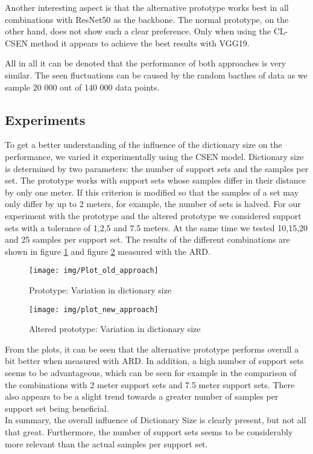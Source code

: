 \documentclass[a4paper, 11pt]{article}
\begin{document}
\begin{multicols}{2}
\begin{flushleft}
Another interesting aspect is that the alternative prototype works best in all combinations with ResNet50 as the backbone. The normal prototype, on the other hand, does not show such a clear preference. Only when using the CL-CSEN method it appears to achieve the best results with VGG19.

All in all it can be denoted that the performance of both approaches is very similar. The seen fluctuations can be caused by the random bacthes of data as we sample 20 000 out of 140 000 data points.
\end{flushleft}

\subsection{Experiments}\label{sec:experiments}
\begin{flushleft}
To get a better understanding of the influence of the dictionary size on the performance, we varied it experimentally using the CSEN model. Dictionary size is determined by two parameters: the number of support sets and the samples per set. The prototype works with support sets whose samples differ in their distance by only one meter. If this criterion is modified so that the samples of a set may only differ by up to 2 meters, for example, the number of sets is halved. For our experiment with the prototype and the altered prototype we considered support sets with a tolerance of 1,2,5 and 7.5 meters. At the same time we tested 10,15,20 and 25 samples per support set. The results of the different combinations are shown in figure \ref{fig:plot_old} and figure \ref{fig:plot_new} measured with the ARD. 
\begin{figure}[H]
\centering
\texttt{[image: img/Plot\_old\_approach]}
\caption{Prototype: Variation in dictionary size}
\label{fig:plot_old}
\end{figure}
\begin{figure}[H]
\centering
\texttt{[image: img/plot\_new\_approach]}
\caption{Altered prototype: Variation in dictionary size}
\label{fig:plot_new}
\end{figure}
\end{flushleft}
From the plots, it can be seen that the alternative prototype performs overall a bit better when measured with ARD. In addition, a high number of support sets seems to be advantageous, which can be seen for example in the comparison of the combinations with 2 meter support sets and 7.5 meter support sets. There also appears to be a slight trend towards a greater number of samples per support set being beneficial. \\
In summary, the overall influence of Dictionary Size is clearly present, but not all that great. Furthermore, the number of support sets seems to be considerably more relevant than the actual samples per support set.

\end{multicols}
\end{document}
